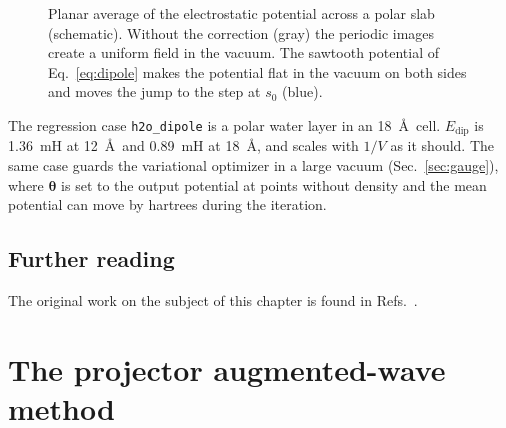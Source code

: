 \documentclass[11pt,a4paper,oneside]{book}
\newcommand{\vth}{\bm\theta}
\begin{document}
\begin{figure}[t]
\centering
{}
\caption{Planar average of the electrostatic potential across a polar
slab (schematic). Without the correction (gray) the periodic images
create a uniform field in the vacuum. The sawtooth potential of
Eq.~\eqref{eq:dipole} makes the potential flat in the vacuum on both
sides and moves the jump to the step at $s_0$ (blue).}
\label{fig:dipole}
\end{figure}

The regression case \texttt{h2o\_dipole} is a polar water layer in an
18~\AA\ cell. $E_{\mathrm{dip}}$ is 1.36~mH at 12~\AA\ and 0.89~mH at
18~\AA, and scales with $1/V$ as it should. The same case guards
the variational optimizer in a large vacuum (Sec.~\ref{sec:gauge}), where
$\vth$ is set to the output potential at points without density and the
mean potential can move by hartrees during the iteration.


\section*{Further reading}
The original work on the subject of this chapter is found in
Refs.~\cite{Payne1992,MonkhorstPack1976,neugebauer92_prb46_16067,bengtsson99_prb59_12301}.

\chapter{The projector augmented-wave method}\label{chap:paw}
\minitoc
\end{document}

